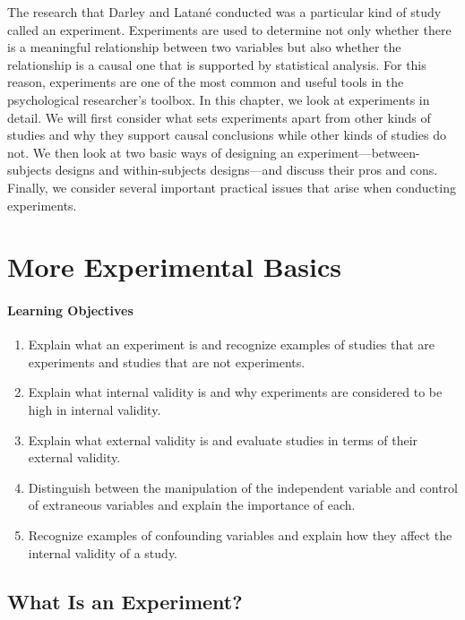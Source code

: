 The research that Darley and Latan\'e conducted was a particular kind of study called an experiment. Experiments are used to determine not only whether there is a meaningful relationship between two variables but also whether the relationship is a causal one that is supported by statistical analysis. For this reason, experiments are one of the most common and useful tools in the psychological researcher's toolbox. In this chapter, we look at experiments in detail. We will first consider what sets experiments apart from other kinds of studies and why they support causal conclusions while other kinds of studies do not. We then look at two basic ways of designing an experiment---between-subjects designs and within-subjects designs---and discuss their pros and cons. Finally, we consider several important practical issues that arise when conducting experiments.

\section{More Experimental Basics}

  \paragraph{Learning Objectives}
  \begin{enumerate}
  \item Explain what an experiment is and recognize examples of studies that are experiments and studies that are not experiments.
   \item Explain what internal validity is and why experiments are considered to be high in internal validity.
   \item  Explain what external validity is and evaluate studies in terms of their external validity.
   \item  Distinguish between the manipulation of the independent variable and control of extraneous variables and explain the importance of each.
   \item  Recognize examples of confounding variables and explain how they affect the internal validity of a study.
   \end{enumerate}


 \subsection{What Is an Experiment?}


